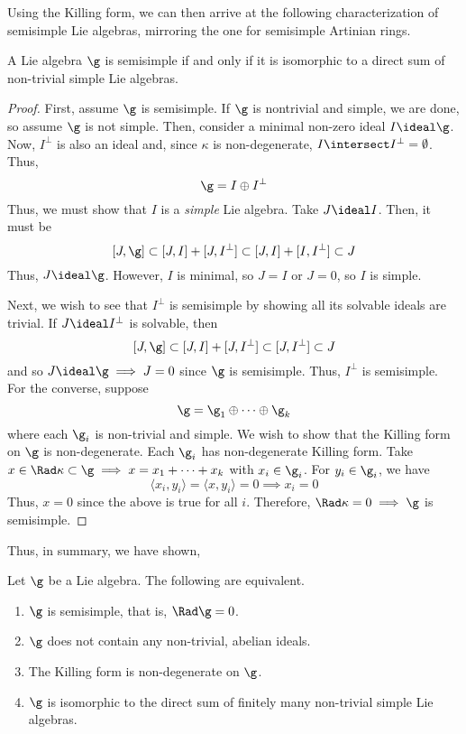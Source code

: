 \documentclass[11pt,leqno,oneside]{amsart}
\numberwithin{thm}{section}
\begin{document}
Using the Killing form, we can then arrive at the following
characterization of semisimple Lie algebras, mirroring the one for
semisimple Artinian rings.
\begin{thm}\label{structure-theorem-of-ss-las}
  A Lie algebra \(\g\) is semisimple if and only if it is isomorphic
  to a direct sum of non-trivial simple Lie algebras. 
\end{thm}
\begin{proof}
  First, assume \(\g\) is semisimple. If \(\g\) is nontrivial and
  simple, we are done, so assume \(\g\) is not simple. Then, consider
  a minimal non-zero ideal \(I \ideal \g\). Now, \(I^\perp\) is also
  an ideal and, since \(\kappa\) is non-degenerate, \(I \intersect
  I^\perp = \emptyset\). Thus, \[
    \g = I \oplus I^\perp
  \]
  Thus, we must show that \(I\) is a \emph{simple} Lie algebra. Take
  \(J \ideal I\). Then, it must be \[
    [J,\g] \subset [J,I] + [J,I^\perp] \subset [J,I] + [I,I^\perp] \subset J
  \]
  Thus, \(J \ideal \g\). However, \(I\) is minimal, so \(J = I\) or
  \(J=0\), so \(I\) is simple.

  Next, we wish to see that \(I^\perp\) is semisimple by showing all its
  solvable ideals are trivial. If \(J \ideal I^\perp\) is
  solvable, then \[
    [J,\g] \subset [J,I]+[J,I^\perp] \subset [J,I^\perp] \subset J
  \]
  and so \(J \ideal \g \implies J = 0\) since \(\g\) is
  semisimple. Thus, \(I^\perp\) is semisimple. \\

  For the converse, suppose \[
    \g = \g_1 \oplus \cdots \oplus \g_k
  \]
  where each \(\g_i\) is non-trivial and simple. We wish to show that
  the Killing form 
  on \(\g\) is non-degenerate. Each \(\g_i\) has non-degenerate
  Killing form. Take \(x \in \Rad \kappa \subset \g \implies x = x_1 +
  \cdots + x_k\) with \(x_i \in \g_i\). For \(y_i \in \g_i\), we
  have \[
    \langle x_i, y_i \rangle = \langle x,y_i \rangle = 0 \implies x_i
    = 0
  \]
  Thus, \(x = 0\) since the above is true for all \(i\). Therefore,
  \(\Rad \kappa = 0 \implies \g\) is semisimple.
\end{proof}
Thus, in summary, we have shown,
\begin{thm}
  Let \(\g\) be a Lie algebra. The following are equivalent.
  \begin{enumerate}
  \item \(\g\) is semisimple, that is, \(\Rad \g = 0\).
  \item \(\g\) does not contain any non-trivial, abelian ideals.
  \item The Killing form is non-degenerate on \(\g\).
  \item \(\g\) is isomorphic to the direct sum of finitely many
    non-trivial simple Lie algebras.
  \end{enumerate}
\end{thm}
\end{document}
